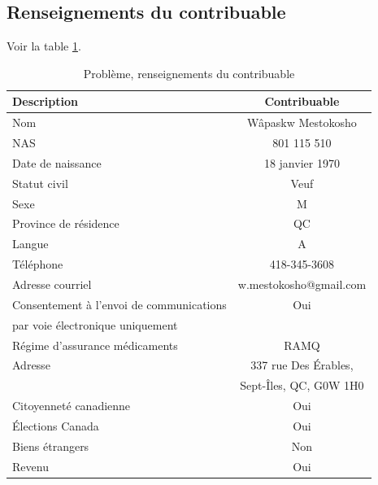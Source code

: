 \subsection{Renseignements du contribuable}
Voir la table \ref{table:chapitre5ProblemeRenseignementsContribuable}.
\begin{table}
	\centering
	\begin{tabular}{|l|c|}
		\hline
		\rowcolor{LightGreen} Description        &      Contribuable      \\ \hline
		Nom                                      &   Wâpaskw Mestokosho   \\ \hline
		NAS                                      &      801 115 510       \\ \hline
		Date de naissance                        &    18 janvier 1970     \\ \hline
		Statut civil                             &          Veuf          \\ \hline
		Sexe                                     &           M            \\ \hline
		Province de résidence                    &           QC           \\ \hline
		Langue                                   &           A            \\ \hline
		Téléphone                                &      418-345-3608      \\ \hline
		Adresse courriel                         & w.mestokosho@gmail.com \\ \hline
		Consentement à l'envoi de communications &          Oui           \\
		par voie électronique uniquement         &                        \\ \hline
		Régime d'assurance médicaments           &          RAMQ          \\ \hline
		Adresse                                  &  337 rue Des Érables,  \\
		                                         & Sept-Îles, QC, G0W 1H0 \\ \hline
		Citoyenneté canadienne                   &          Oui           \\ \hline
		Élections Canada                         &          Oui           \\ \hline
		Biens étrangers                          &          Non           \\ \hline
		Revenu                                   &          Oui           \\ \hline
	\end{tabular}
	\caption[]{Problème, renseignements du contribuable}
	\label{table:chapitre5ProblemeRenseignementsContribuable}
\end{table}


